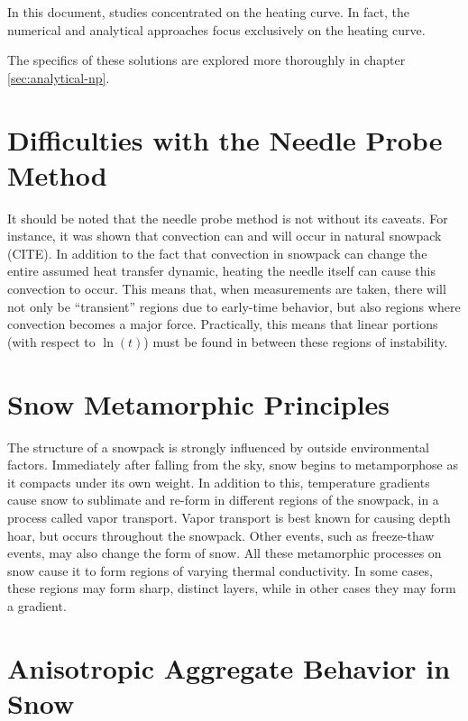 In this document, studies concentrated on the heating curve. In fact, the
numerical and analytical approaches focus exclusively on the heating curve.


The specifics of these solutions are explored more thoroughly in chapter
\ref{sec:analytical-np}.

\section{Difficulties with the Needle Probe Method}

It should be noted that the needle probe method is not without its caveats. For
instance, it was shown that convection can and will occur in natural snowpack
(CITE). In addition to the fact that convection in snowpack can change the
entire assumed heat transfer dynamic, heating the needle itself can cause this
convection to occur. This means that, when measurements are taken, there will
not only be ``transient'' regions due to early-time behavior, but also regions
where convection becomes a major force. Practically, this means that linear
portions (with respect to \(\ln(t)\)) must be found in between these regions
of instability.

\section{Snow Metamorphic Principles}
\label{sec:introduction:metamorphic}

The structure of a snowpack is strongly influenced by outside environmental
factors. Immediately after falling from the sky, snow begins to metamporphose as
it compacts under its own weight. In addition to this, temperature gradients
cause snow to sublimate and re-form in different regions of the snowpack, in a
process called vapor transport. Vapor transport is best known for causing
depth hoar, but occurs throughout the snowpack. Other events, such as
freeze-thaw events, may also change the form of snow. All these metamorphic
processes on snow cause it to form regions of varying thermal conductivity. In
some cases, these regions may form sharp, distinct layers, while in other cases
they may form a gradient.

\section{Anisotropic Aggregate Behavior in Snow}

